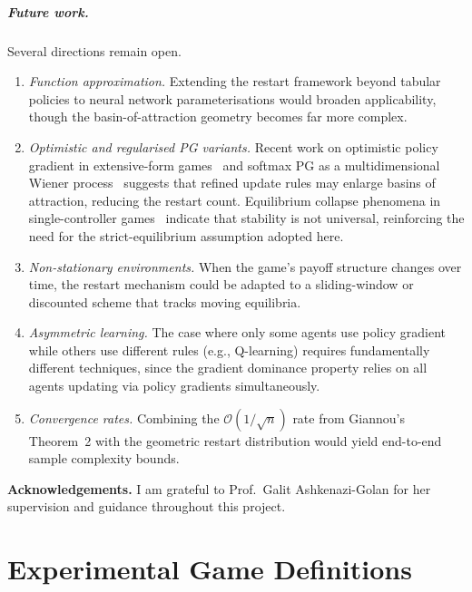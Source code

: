 \documentclass[a4paper,oneside,11pt]{report}
\numberwithin{theorem}{chapter}
\numberwithin{equation}{chapter}
\begin{document}
\paragraph{Future work.}
Several directions remain open.
\begin{enumerate}[label=(\alph*)]
\item \emph{Function approximation.} Extending the restart framework
  beyond tabular policies to neural network parameterisations would
  broaden applicability, though the basin-of-attraction geometry
  becomes far more complex.
\item \emph{Optimistic and regularised PG variants.} Recent work on
  optimistic policy gradient in extensive-form
  games~\cite{kalogiannis2025} and softmax PG as a multidimensional
  Wiener process~\cite{leung2024} suggests that refined update rules
  may enlarge basins of attraction, reducing the restart count.
  Equilibrium collapse phenomena in single-controller
  games~\cite{anagnostides2024} indicate that stability is not
  universal, reinforcing the need for the strict-equilibrium assumption
  adopted here.
\item \emph{Non-stationary environments.} When the game's payoff
  structure changes over time, the restart mechanism could be adapted
  to a sliding-window or discounted scheme that tracks moving
  equilibria.
\item \emph{Asymmetric learning.} The case where only some agents use
  policy gradient while others use different rules (e.g., Q-learning)
  requires fundamentally different techniques, since the gradient
  dominance property relies on all agents updating via policy gradients
  simultaneously.
\item \emph{Convergence rates.} Combining the
  $\mathcal{O}(1/\sqrt{n})$ rate from Giannou's Theorem~2 with the
  geometric restart distribution would yield end-to-end sample
  complexity bounds.
\end{enumerate}

\bigskip

\noindent\textbf{Acknowledgements.} I am grateful to Prof.\ Galit
Ashkenazi-Golan for her supervision and guidance throughout this
project.

\appendix
\chapter{Experimental Game Definitions}
\label{app:games}
\end{document}
